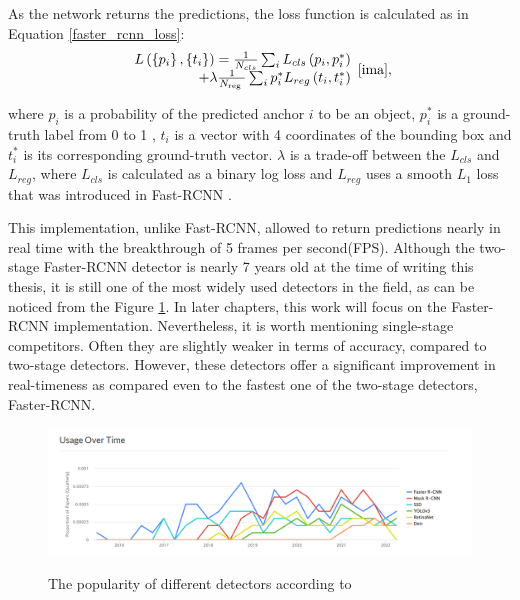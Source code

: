 \documentclass[english, 12pt, a4paper, elec, utf8, a-1b, online]{aaltothesis}
\begin{document}
As the network returns the predictions, the loss function is calculated as in Equation \ref{faster_rcnn_loss}:  
\begin{equation}
\begin{array}{r}
L\left(\left\{p_{i}\right\},\left\{t_{i}\right\}\right)=\frac{1}{N_{c l s}} \sum_{i} L_{c l s}\left(p_{i}, p_{i}^{*}\right) \\
+\lambda \frac{1}{N_{\text {reg }}} \sum_{i} p_{i}^{*} L_{r e g}\left(t_{i}, t_{i}^{*}\right)
\end{array}
\label{faster_rcnn_loss} 
\cite{ima},
\end{equation}

where $p_i$ is a probability of the predicted anchor $i$ to be an object,  $p_{i}^{*}$ is a ground-truth label from 0 to 1 , $t_i$ is a vector with 4 coordinates of the bounding box and $t_{i}^{*}$ is its corresponding ground-truth vector. $\lambda$ is a trade-off between the $L_{cls}$ and $L_{reg}$, where $L_{c l s}$ is calculated as a binary log loss and $L_{reg}$ uses a smooth $L_1$ loss that was introduced in Fast-RCNN \cite{Girshick2015}.  




This implementation, unlike Fast-RCNN, allowed to return predictions nearly in real time with the breakthrough of 5 frames per second(FPS)\cite{ima}.
Although the two-stage Faster-RCNN detector is nearly 7 years old at the time of writing this thesis, it is still one of the most widely used detectors in the field, as can be noticed from the Figure \ref{popularity}. In later chapters, this work will focus on the Faster-RCNN implementation. Nevertheless, it is worth mentioning single-stage competitors. Often they are slightly weaker in terms of accuracy, compared to two-stage detectors. However, these detectors offer a significant improvement in real-timeness as compared even to the fastest one of the two-stage detectors, Faster-RCNN. 

\begin{figure}[htb]
	\begin{center}
		\includegraphics[width=14cm]{./detectorsPopularity.png}
	\end{center}
	\caption{The popularity of different detectors according to \cite{paperswithcode_1:2022}}
	\begin{center}
		\label{popularity}
	\end{center}
\end{figure}
\FloatBarrier
\end{document}
